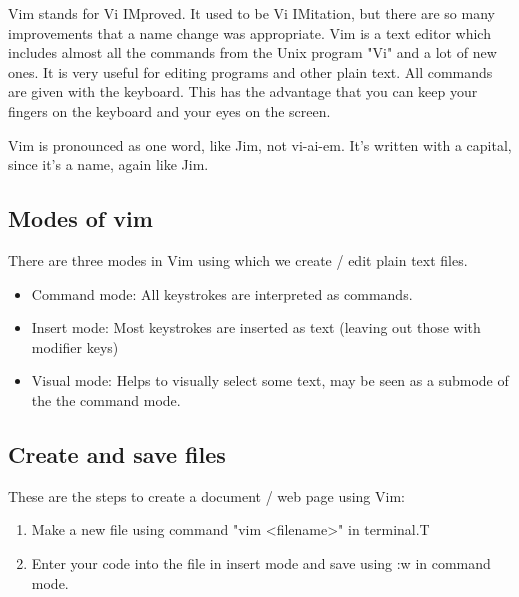 
\noindent Vim stands for Vi IMproved.  It used to be Vi IMitation, but there are so many
improvements that a name change was appropriate.  Vim is a text editor which
includes almost all the commands from the Unix program "Vi" and a lot of new
ones.  It is very useful for editing programs and other plain text. All commands 
are given with the keyboard.  This has the advantage that you can keep your 
fingers on the keyboard and your eyes on the screen.

Vim is pronounced as one word, like Jim, not vi-ai-em.  It's written with a
capital, since it's a name, again like Jim.

\subsection{Modes of vim} 
There are three modes in Vim using which we create / edit plain 
text files.
\begin{itemize}
\item Command mode: All keystrokes are interpreted as commands.
\item Insert mode: Most keystrokes are inserted as text (leaving out those with
modifier keys)
\item Visual mode: Helps to visually select some text, may be seen as a submode of
the the command mode.
\end{itemize}

\subsection{Create and save files}
These are the steps to create a document / web page using Vim:
\begin{enumerate}
\item Make a new file using command "vim <filename>" in terminal.T
\item Enter your code into the file in insert mode and save using :w in 
command mode. 
\end{enumerate}




